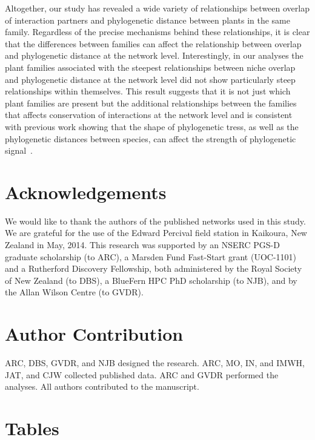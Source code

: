 \documentclass[12pt]{article}
\begin{document}
\begin{spacing}{1.5}
  Altogether, our study has revealed a wide variety of relationships 
  between overlap of interaction partners and phylogenetic distance 
  between plants in the same family. Regardless of the precise mechanisms
  behind these relationships, it is clear
  that the differences between families can affect the relationship
  between overlap and phylogenetic distance at the network level. 
  Interestingly, in our analyses the plant families associated with
  the steepest relationships between niche overlap and phylogenetic
  distance at the network level did not show particularly steep
  relationships within themselves. This result suggests
  that it is not just which plant families are present but the additional 
  relationships between the families that affects conservation of
  interactions at the network level and is consistent with previous
  work showing that the shape of phylogenetic tress, as well as the
  phylogenetic distances between species, can affect the strength
  of phylogenetic signal~\citep{Chamberlain2014a}. 


\section*{Acknowledgements}

  We would like to thank the authors of the published networks used in this study. 
  We are grateful for the use of the Edward Percival field station in Kaikoura, 
  New Zealand in May, 2014. This research was supported by an NSERC PGS-D 
  graduate scholarship (to ARC), a Marsden Fund Fast-Start grant (UOC-1101) and a 
  Rutherford Discovery Fellowship, both administered by the Royal Society of New 
  Zealand (to DBS), a BlueFern HPC PhD scholarship (to NJB), and by
  the Allan Wilson Centre (to GVDR).


\section*{Author Contribution}

  ARC, DBS, GVDR, and NJB designed the research. ARC, MO, IN, and IMWH, JAT, and CJW collected published data. 
  ARC and GVDR performed the analyses. All authors contributed to the manuscript.

\end{spacing}

\newpage

\renewcommand*{\bibfont}{\raggedright}



\newpage
\section*{Tables}
\end{document}
